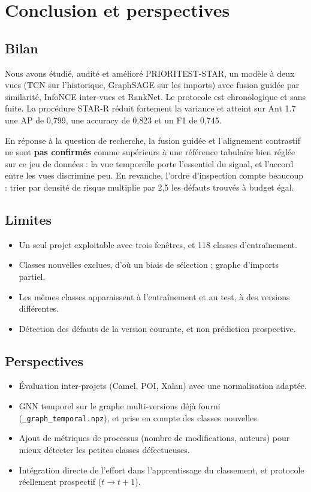 \documentclass[11pt,a4paper,openany]{report}
\newcommand{\code}[1]{\texttt{\small #1}}
\begin{document}
\chapter{Conclusion et perspectives}

\section{Bilan}
Nous avons étudié, audité et amélioré PRIORITEST-STAR, un modèle à deux vues (TCN sur l'historique, GraphSAGE sur
les imports) avec fusion guidée par similarité, InfoNCE inter-vues et RankNet. Le protocole est chronologique et sans
fuite. La procédure STAR-R réduit fortement la variance et atteint sur Ant 1.7 une AP de 0,799, une accuracy de
0,823 et un F1 de 0,745.

En réponse à la question de recherche, la fusion guidée et l'alignement contrastif ne sont \textbf{pas confirmés}
comme supérieurs à une référence tabulaire bien réglée sur ce jeu de données : la vue temporelle porte l'essentiel
du signal, et l'accord entre les vues discrimine peu. En revanche, l'ordre d'inspection compte beaucoup : trier par
densité de risque multiplie par 2,5 les défauts trouvés à budget égal.

\section{Limites}
\begin{itemize}
  \item Un seul projet exploitable avec trois fenêtres, et 118 classes d'entraînement.
  \item Classes nouvelles exclues, d'où un biais de sélection ; graphe d'imports partiel.
  \item Les mêmes classes apparaissent à l'entraînement et au test, à des versions différentes.
  \item Détection des défauts de la version courante, et non prédiction prospective.
\end{itemize}

\section{Perspectives}
\begin{itemize}
  \item Évaluation inter-projets (Camel, POI, Xalan) avec une normalisation adaptée.
  \item GNN temporel sur le graphe multi-versions déjà fourni (\code{\_graph\_temporal.npz}), et prise en compte des
        classes nouvelles.
  \item Ajout de métriques de processus (nombre de modifications, auteurs) pour mieux détecter les petites classes
        défectueuses.
  \item Intégration directe de l'effort dans l'apprentissage du classement, et protocole réellement prospectif
        ($t\to t+1$).
\end{itemize}
\end{document}
